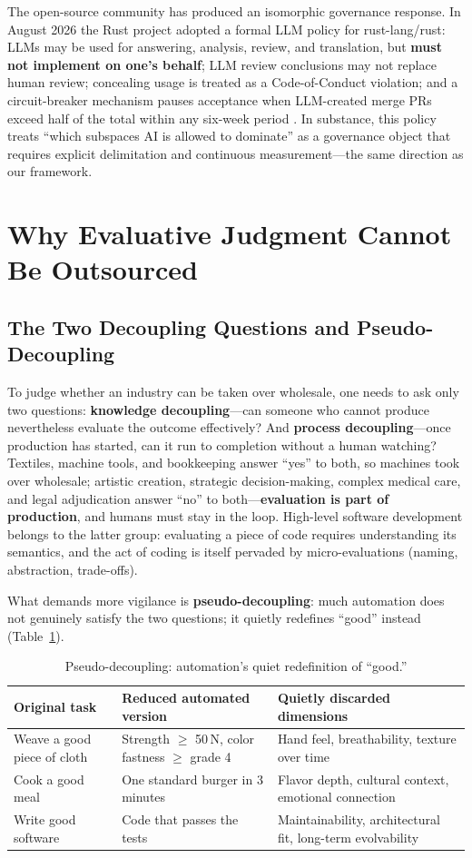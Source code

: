 \documentclass[11pt]{article}
\begin{document}
The open-source community has produced an isomorphic governance response.
In August 2026 the Rust project adopted a formal LLM policy for
rust-lang/rust: LLMs may be used for answering, analysis, review, and
translation, but \textbf{must not implement on one's behalf}; LLM review
conclusions may not replace human review; concealing usage is treated as a
Code-of-Conduct violation; and a circuit-breaker mechanism pauses
acceptance when LLM-created merge PRs exceed half of the total within any
six-week period \cite{rustblog,rustpolicy}. In substance, this policy
treats ``which subspaces AI is allowed to dominate'' as a governance object
that requires explicit delimitation and continuous measurement---the same
direction as our framework.

\section{Why Evaluative Judgment Cannot Be Outsourced}
\subsection{The Two Decoupling Questions and Pseudo-Decoupling}
To judge whether an industry can be taken over wholesale, one needs to ask
only two questions: \textbf{knowledge decoupling}---can someone who cannot
produce nevertheless evaluate the outcome effectively? And \textbf{process
decoupling}---once production has started, can it run to completion without
a human watching? Textiles, machine tools, and bookkeeping answer ``yes''
to both, so machines took over wholesale; artistic creation, strategic
decision-making, complex medical care, and legal adjudication answer ``no''
to both---\textbf{evaluation is part of production}, and humans must stay
in the loop. High-level software development belongs to the latter group:
evaluating a piece of code requires understanding its semantics, and the
act of coding is itself pervaded by micro-evaluations (naming,
abstraction, trade-offs).

What demands more vigilance is \textbf{pseudo-decoupling}: much automation
does not genuinely satisfy the two questions; it quietly redefines
``good'' instead (Table~\ref{tab:pseudo}).

\begin{table}[t]
\centering
\small
\begin{tabular}{p{3.4cm}p{4.6cm}p{6.2cm}}
\toprule
\textbf{Original task} & \textbf{Reduced automated version} &
\textbf{Quietly discarded dimensions} \\
\midrule
Weave a good piece of cloth & Strength $\geq$ 50\,N, color fastness
$\geq$ grade 4 & Hand feel, breathability, texture over time \\
Cook a good meal & One standard burger in 3 minutes & Flavor depth,
cultural context, emotional connection \\
Write good software & Code that passes the tests & Maintainability,
architectural fit, long-term evolvability \\
\bottomrule
\end{tabular}
\caption{Pseudo-decoupling: automation's quiet redefinition of ``good.''}
\label{tab:pseudo}
\end{table}
\end{document}
